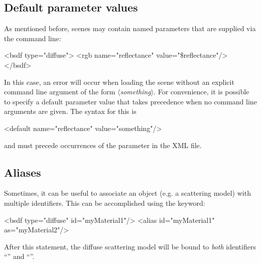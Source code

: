 \subsection{Default parameter values}
As mentioned before, scenes may contain named parameters that are supplied via the command line:
\begin{xml}
<bsdf type="diffuse">
    <rgb name="reflectance" value="$\texttt{\$}$reflectance"/>
</bsdf>
\end{xml}
In this case, an error will occur when loading the scene without an explicit command line argument of the form
\mbox{$\langle$\emph{something}$\rangle$}. For convenience, it is possible to specify
a default parameter value that takes precedence when no command line arguments are given. The syntax for this is
\begin{xml}
<default name="reflectance" value="something"/>
\end{xml}
and must precede occurrences of the parameter in the XML file.

\subsection{Aliases}
Sometimes, it can be useful to associate an object (e.g. a scattering model)
with multiple identifiers. This can be accomplished using the  keyword:
\begin{xml}
<bsdf type="diffuse" id="myMaterial1"/>
<alias id="myMaterial1" as="myMaterial2"/>
\end{xml}
After this statement, the diffuse scattering model will be bound to
\emph{both} identifiers ``'' and ``''.
